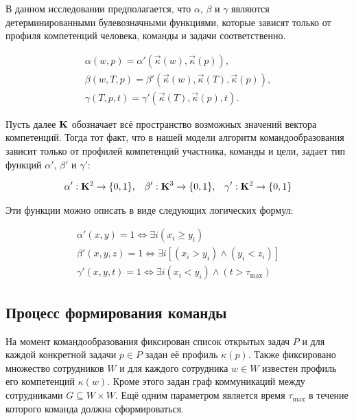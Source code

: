 В данном исследовании предполагается, что $\alpha$, $\beta$ и $\gamma$ являются детерминированными булевозначными функциями, которые зависят только от профиля компетенций человека, команды и задачи соответственно. 

\begin{eqnarray} \label{eq:team4}
\alpha(w, p) = \alpha'(\vec{\kappa}(w), \vec{\kappa}(p)),\\
\beta(w, T, p) = \beta'(\vec{\kappa}(w), \vec{\kappa}(T), \vec{\kappa}(p)),\\
\gamma(T, p, t) = \gamma'(\vec{\kappa}(T), \vec{\kappa}(p), t).
\end{eqnarray}

Пусть далее $\bf K$ обозначает всё пространство возможных значений вектора компетенций. Тогда тот факт, что в нашей модели алгоритм командообразования зависит только от профилей компетенций участника, команды и цели, задает тип функций $\alpha'$, $\beta'$ и $\gamma'$:

\begin{eqnarray} \label{eq:team5}
\alpha': {\bf K} ^2 \to \{0, 1\},\;\;\;
\beta': {\bf K} ^3 \to \{0, 1\},\;\;\;
\gamma': {\bf K} ^2 \to \{0, 1\}
\end{eqnarray}

Эти функции можно описать в виде следующих логических формул:

\begin{eqnarray} \label{eq:team6}
\alpha'(x,y)=1 \iff \exists i (x_i \geq y_i) \\
\beta'(x,y,z)=1 \iff \exists i [(x_i > y_i) \wedge (y_i < z_i)]  \\
\gamma'(x,y,t)=1 \iff \exists i (x_i < y_i)  \wedge (t > \tau_{\max})
\end{eqnarray}

\subsection{Процесс формирования команды}
На момент командообразования фиксирован список открытых задач ${P}$ и для каждой конкретной задачи $p\in {P}$ задан её профиль $\kappa(p)$. 
Также фиксировано множество сотрудников $W$ и для каждого сотрудника $w\in W$ известен профиль его компетенций $\kappa(w)$. 
Кроме этого задан граф коммуникаций между сотрудниками $G\subseteq W\times W$. 
Ещё одним параметром является время $\tau_{\max}$ в течение которого команда должна сформироваться.

